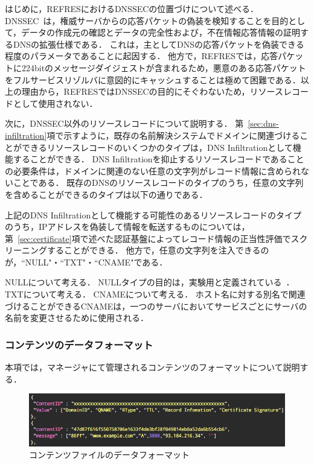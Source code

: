 はじめに，REFRESにおけるDNSSECの位置づけについて述べる．
DNSSEC~\cite{rfc4033}は，権威サーバからの応答パケットの偽装を検知することを目的として，データの作成元の確認とデータの完全性および，不在情報応答情報の証明するDNSの拡張仕様である．
これは，主としてDNSの応答パケットを偽装できる程度のパラメータであることに起因する．
他方で，REFRESでは，応答パケットに224bitのメッセージダイジェストが含まれるため，悪意のある応答パケットをフルサービスリゾルバに意図的にキャッシュすることは極めて困難である．以上の理由から，REFRESではDNSSECの目的にそぐわないため，リソースレコードとして使用されない．

次に，DNSSEC以外のリソースレコードについて説明する．
第~\ref{sec:dns-infiltration}項で示すように，既存の名前解決システムでドメインに関連づけることができるリソースレコードのいくつかのタイプは，DNS Infiltrationとして機能することができる．
DNS Infiltrationを抑止するリソースレコードであることの必要条件は，ドメインに関連のない任意の文字列がレコード情報に含められないことである．
既存のDNSのリソースレコードのタイプのうち，任意の文字列を含めることができるのタイプは以下の通りである．



上記のDNS Infiltrationとして機能する可能性のあるリソースレコードのタイプのうち，IPアドレスを偽装して情報を転送するものについては，第~\ref{sec:certificate}項で述べた認証基盤によってレコード情報の正当性評価でスクリーニングすることができる．
他方で，任意の文字列を注入できるのが，``NULL"・``TXT"・``CNAME"である．

NULLについて考える．
NULLタイプの目的は，実験用と定義されている~\cite{rfc1035}．
TXTについて考える．
CNAMEについて考える．
ホスト名に対する別名で関連づけることができるCNAMEは，一つのサーバにおいてサービスごとにサーバの名前を変更させるために使用される．


\subsubsection{コンテンツのデータフォーマット}
本項では，マネージャにて管理されるコンテンツのフォーマットについて説明する．

\begin{figure}[h]
 \centering
 \includegraphics[scale=0.5]{figure/content-file.png}
 \caption{コンテンツファイルのデータフォーマット}
 \label{fig:manager-provider}
\end{figure}

